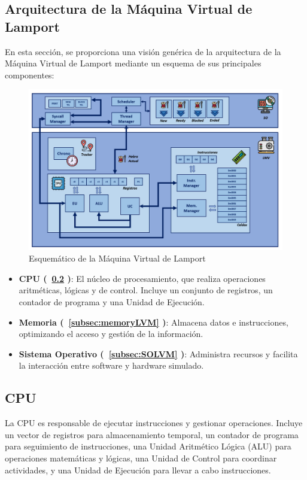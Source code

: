 \subsection{Arquitectura de la Máquina Virtual de Lamport}\label{subsec:archLVM}
En esta sección, se proporciona una visión genérica de la arquitectura de la Máquina Virtual de Lamport mediante un esquema de sus principales componentes:

\begin{figure}[h]
    \includegraphics[width=\linewidth]{images/lmp/LVM_resume.png}
    \caption{Esquemático de la Máquina Virtual de Lamport}
    \label{fig:LVMResume}
\end{figure}

\begin{itemize}
    \item \textbf{CPU (~\ref{subsubsec:CPULVM} )}: El núcleo de procesamiento, que realiza operaciones aritméticas, lógicas y de control. Incluye un conjunto de registros, un contador de programa y una Unidad de Ejecución.
    
    \item \textbf{Memoria (~\ref{subsec:memoryLVM} )}: Almacena datos e instrucciones, optimizando el acceso y gestión de la información.

    \item \textbf{Sistema Operativo (~\ref{subsec:SOLVM} )}: Administra recursos y facilita la interacción entre software y hardware simulado.
\end{itemize}

\subsection{CPU}\label{subsubsec:CPULVM}
La CPU es responsable de ejecutar instrucciones y gestionar operaciones. Incluye un vector de registros para almacenamiento temporal, un contador de programa para seguimiento de instrucciones, una Unidad Aritmético Lógica (ALU) para operaciones matemáticas y lógicas, una Unidad de Control para coordinar actividades, y una Unidad de Ejecución para llevar a cabo instrucciones.

